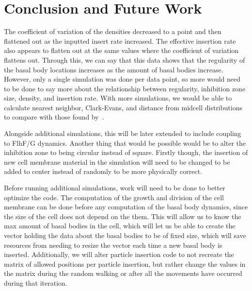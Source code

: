 \chapter{Conclusion and Future Work}

The coefficient of variation of the densities decreased to a point and then flattened out as the inputted insert rate increased. The effective insertion rate also appears to flatten out at the same values where the coefficient of variation flattens out. Through this, we can say that this data shows that the regularity of the basal body locations increases as the amount of basal bodies increase. However, only a single simulation was done per data point, so more would need to be done to say more about the relationship between regularity, inhibition zone size, density, and insertion rate. With more simulations, we would be able to calculate nearest neighbor, Clark-Evans, and distance from midcell distributions to compare with those found by~\cite{Guttenplan2013}.

Alongside additional simulations, this will be later extended to include coupling to FlhF/G dynamics. Another thing that would be possible would be to alter the inhibition zone to being circular instead of square. Firstly though, the insertion of new cell membrane material in the simulation will need to be changed to be added to center instead of randomly to be more physically correct.

Before running additional simulations, work will need to be done to better optimize the code. The computation of the growth and division of the cell membrane can be done before any computation of the basal body dynamics, since the size of the cell does not depend on the them. This will allow us to know the max amount of basal bodies in the cell, which will let us be able to create the vector holding the data about the basal bodies to be of fixed size, which will save resources from needing to resize the vector each time a new basal body is inserted. Additionally, we will alter particle insertion code to not recreate the matrix of allowed positions per particle insertion, but rather change the values in the matrix during the random walking or after all the movements have occurred during that iteration.